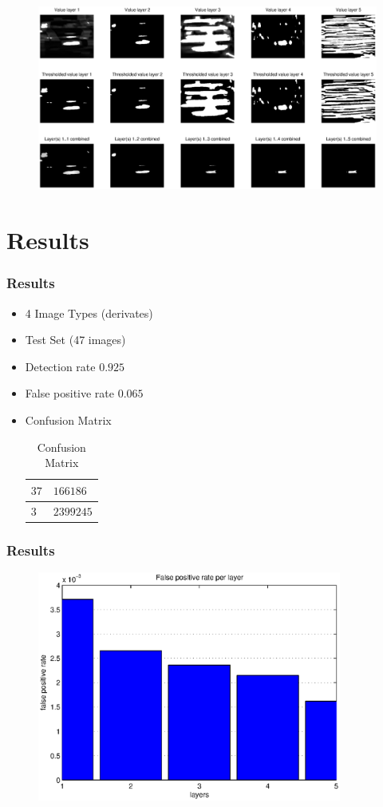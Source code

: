 \documentclass{beamer}
\begin{document}
\frame
{
	\begin{figure}[!ht]
	\centering
	\includegraphics[width=12cm]{../report/img/cascader_img14}
	\label{fig:cascader}
	\end{figure}
}

\section{Results}
\frame
{
  \frametitle{Results}
	
  \begin{itemize}
  \item <+-| alert@+> 4 Image Types (derivates)
  \item <+-| alert@+> Test Set (47 images)
  \item <+-| alert@+> Detection rate $0.925$
  \item <+-| alert@+> False positive rate $0.065$
  \item <+-| alert@+> Confusion Matrix
  \begin{table}[!ht]
  \centering
  \begin{tabular}{|l|l|}
  \hline
  $37$ & $166186$ \\
  \hline
  $3$  & $2399245$ \\
  \hline
  \end{tabular}
  \caption{Confusion Matrix}
  \label{tab:conf}
  \end{table}
  \end{itemize}
}

\frame
{
  \frametitle{Results}
  \begin{figure}[!ht]
  \centering
  \includegraphics[width=10cm]{../report/img/fprate}
  \end{figure}
}
\end{document}
